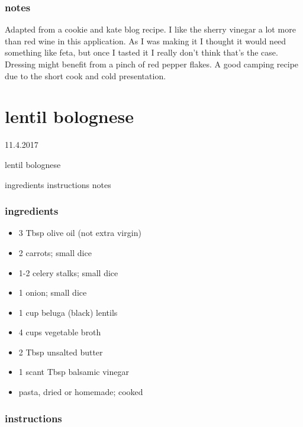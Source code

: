 \documentclass[]{book}
\providecommand{\tightlist}{%
  \setlength{\itemsep}{0pt}\setlength{\parskip}{0pt}}
\begin{document}
\hypertarget{notes-1}{%
\subsection{notes}\label{notes-1}}

Adapted from a cookie and kate blog recipe. I like the sherry vinegar a lot more than red wine in this application. As I was making
it I thought it would need something like feta, but once I tasted it I really don't think that's the case. Dressing might benefit from
a pinch of red pepper flakes. A good camping recipe due to the short cook and cold presentation.

\hypertarget{lentil-bolognese}{%
\chapter{lentil bolognese}\label{lentil-bolognese}}

11.4.2017

lentil bolognese

ingredients \textbar{}
instructions \textbar{}
notes

\hypertarget{ingredients-2}{%
\subsection{ingredients}\label{ingredients-2}}

\begin{itemize}
\tightlist
\item
  3 Tbsp olive oil (not extra virgin)
\item
  2 carrots; small dice
\item
  1-2 celery stalks; small dice
\item
  1 onion; small dice
\item
  1 cup beluga (black) lentils
\item
  4 cups vegetable broth
\item
  2 Tbsp unsalted butter
\item
  1 scant Tbsp balsamic vinegar
\item
  pasta, dried or homemade; cooked
\end{itemize}

\hypertarget{instructions-2}{%
\subsection{instructions}\label{instructions-2}}
\end{document}
